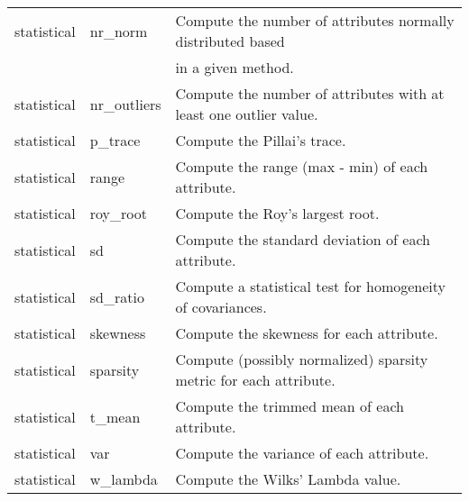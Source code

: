 \begin{table}[h!]
\begin{tabular}{lll}
    statistical & nr\_norm & Compute the number of attributes normally distributed based\\ & & in a given method.\\
    statistical & nr\_outliers & Compute the number of attributes with at least one outlier value.\\
    statistical & p\_trace & Compute the Pillai’s trace.\\
    statistical & range & Compute the range (max - min) of each attribute.\\
    statistical & roy\_root & Compute the Roy’s largest root.\\
    statistical & sd & Compute the standard deviation of each attribute.\\
    statistical & sd\_ratio & Compute a statistical test for homogeneity of covariances.\\
    statistical & skewness & Compute the skewness for each attribute.\\
    statistical & sparsity & Compute (possibly normalized) sparsity metric for each attribute.\\
    statistical & t\_mean & Compute the trimmed mean of each attribute.\\
    statistical & var & Compute the variance of each attribute.\\
    statistical & w\_lambda & Compute the Wilks’ Lambda value.\\\hline
  \end{tabular}
  \label{tab:pymfe-statistical-mf}
\end{table}

